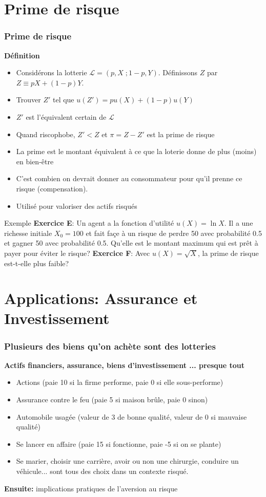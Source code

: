 \documentclass[handout]{beamer}
\newenvironment{iPar}[1]{\textbf{#1} \begin{itemize}}{\end{itemize}}
\newcommand{\mdp}{\medskip \pause}
\newcommand{\mc}{\mathcal}
\begin{document}
\section{Prime de risque}

\begin{frame}\frametitle{Prime de risque}

\begin{iPar}{Définition} \item Considérons la lotterie $\mc L =
(p,X\;;1-p,Y)$. Définissons $Z$ par $Z \equiv pX+ (1-p)Y$. \item Trouver $Z'$ tel que $u(Z') = pu(X) + (1-p)u(Y)$ \item $Z'$ est l'équivalent certain de $\mc L$ \item Quand riscophobe, $Z' < Z$ et $
\pi = Z-Z'$ est la prime de risque \item La prime est le montant équivalent à ce que la loterie donne de plus (moins) en bien-être \item C'est combien on devrait donner au consommateur pour qu'il prenne ce risque (compensation).
\item Utilisé pour valoriser des actifs risqués
\end{iPar}

\end{frame}

\begin{frame}{Exemple}
\textbf{Exercice E}: Un agent a la fonction d'utilité $u(X)=\ln X$. Il a une richesse initiale $X_0 = 100$ et fait façe à un risque de perdre 50 avec probabilité 0.5 et gagner 50 avec probabilité 0.5. Qu'elle est le montant maximum qui est prêt à payer pour éviter le risque?
\textbf{Exercice F}: Avec $u(X) = \sqrt X $, la prime de risque est-t-elle plus faible?
\end{frame}


\section{Applications: Assurance et Investissement}

\begin{frame}\frametitle{Plusieurs des biens qu'on achète sont des lotteries}
\begin{iPar}{Actifs financiers, assurance, biens d'investissement ...
presque tout} \item Actions (paie 10 si la firme performe, paie 0 si elle sous-performe) \item Assurance contre le feu (paie 5 si maison brûle, paie 0
sinon) \item Automobile usagée (valeur de 3 de bonne qualité, valeur de 0 si mauvaise qualité) \item
Se lancer en affaire (paie 15 si fonctionne, paie -5 si on se plante) \item Se marier, choisir une carrière, avoir ou non une chirurgie, conduire un véhicule... sont tous des choix dans un contexte risqué. \end{iPar} \mdp \textbf{Ensuite:} implications pratiques de l'aversion au risque \end{frame}
\end{document}
